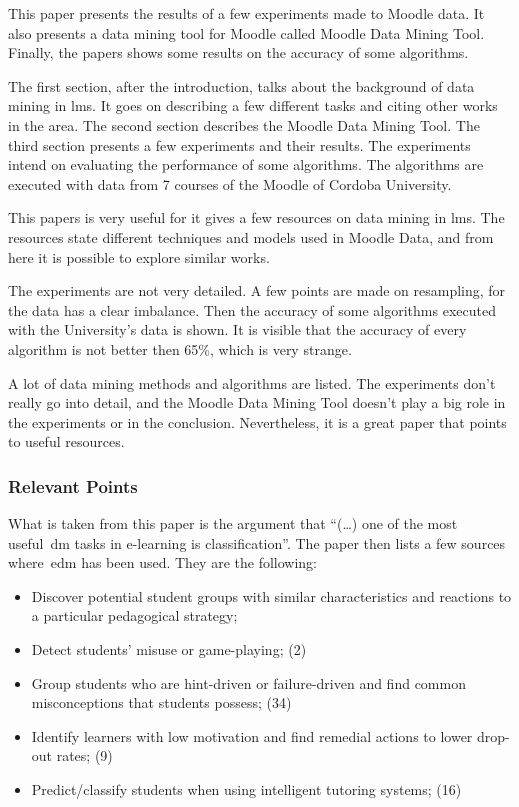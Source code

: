 This paper presents the results of a few experiments made to Moodle data. It
also presents a data mining tool for Moodle called Moodle Data Mining Tool.
Finally, the papers shows some results on the accuracy of some algorithms.

The first section, after the introduction, talks about the background of data
mining in \gls{lms}. It goes on describing a few different tasks and citing
other works in the area. The second section describes the Moodle Data Mining
Tool. The third section presents a few experiments and their results. The
experiments intend on evaluating the performance of some algorithms. The
algorithms are executed with data from 7 courses of the Moodle of Cordoba
University.

This papers is very useful for it gives a few resources on data mining in
\gls{lms}. The resources state different techniques and models used in Moodle
Data, and from here it is possible to explore similar works.

The experiments are not very detailed. A few points are made on resampling, for
the data has a clear imbalance. Then the accuracy of some algorithms executed
with the University's data is shown. It is visible that the accuracy of every
algorithm is not better then 65\%, which is very strange.

A lot of data mining methods and algorithms are listed. The experiments don't
really go into detail, and the Moodle Data Mining Tool doesn't play a big role
in the experiments or in the conclusion. Nevertheless, it is a great paper that
points to useful resources.

\subsubsection{Relevant Points}

What is taken from this paper is the argument that ``(\dots) one of the most
useful~\gls{dm} tasks in e-learning is classification''. The paper then lists a
few sources where~\gls{edm} has been used. They are the following:

\begin{itemize}
    \item Discover potential student groups with similar characteristics and
        reactions to a particular pedagogical strategy;~\cite{ind_002}
    \item Detect students' misuse or game-playing; (2)
    \item Group students who are hint-driven or failure-driven and find common
        misconceptions that students possess; (34)
    \item Identify learners with low motivation and find remedial actions to
        lower drop-out rates; (9)
    \item Predict/classify students when using intelligent tutoring systems;
        (16)
\end{itemize}

